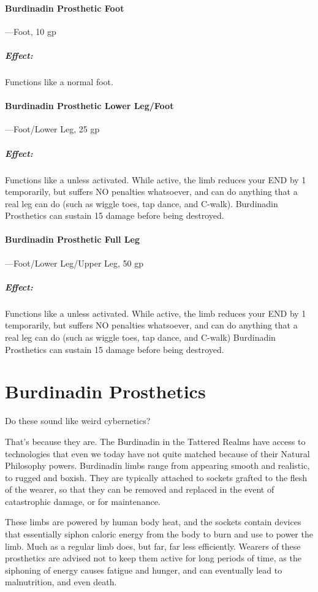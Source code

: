 \documentclass[oneside,11pt,english]{book}
\begin{document}
\paragraph{Burdinadin Prosthetic Foot}---\quad Foot, 10 gp
\vspace{-15pt} \subparagraph{Effect:} Functions like a normal foot.

\paragraph{Burdinadin Prosthetic Lower Leg/Foot}---\quad Foot/Lower Leg, 25 gp
\vspace{-15pt} \subparagraph{Effect:} Functions like a 
unless activated. While active, the limb reduces your END by 1 temporarily, but
suffers NO penalties whatsoever, and can do anything that a real leg can do
(such as wiggle toes, tap dance, and C-walk). Burdinadin Prosthetics can sustain
15 damage before being destroyed.  

\paragraph{Burdinadin Prosthetic Full Leg}---\quad Foot/Lower Leg/Upper Leg, 50 gp
\vspace{-15pt} \subparagraph{Effect:} Functions like a 
unless activated. While active, the limb reduces your END by 1 temporarily, but
suffers NO penalties whatsoever, and can do anything that a real leg can do
(such as wiggle toes, tap dance, and C-walk) Burdinadin Prosthetics can sustain
15 damage before being destroyed. 

\section{Burdinadin Prosthetics}
Do these sound like weird cybernetics? 

That’s because they are. The Burdinadin in the Tattered Realms have access to
technologies that even we today have not quite matched because of their Natural
Philosophy powers. Burdinadin limbs range from appearing smooth and realistic,
to rugged and boxish. They are typically attached to sockets grafted to the
flesh of the wearer, so that they can be removed and replaced in the event of
catastrophic damage, or for maintenance.  

These limbs are powered by human body heat, and the sockets contain devices that
essentially siphon caloric energy from the body to burn and use to power the
limb. Much as a regular limb does, but far, far less efficiently. Wearers of
these prosthetics are advised not to keep them active for long periods of time,
as the siphoning of energy causes fatigue and hunger, and can eventually lead to
malnutrition, and even death.  
\end{document}
